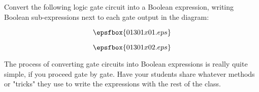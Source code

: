 

Convert the following logic gate circuit into a Boolean expression, writing Boolean sub-expressions next to each gate output in the diagram:

$$\epsfbox{01301x01.eps}$$







$$\epsfbox{01301x02.eps}$$







The process of converting gate circuits into Boolean expressions is really quite simple, if you proceed gate by gate.  Have your students share whatever methods or "tricks" they use to write the expressions with the rest of the class.




